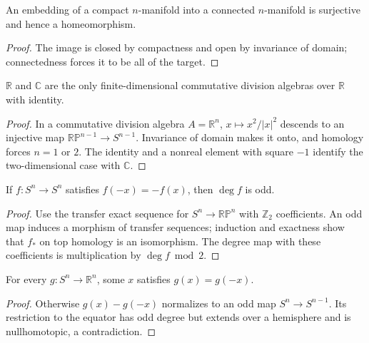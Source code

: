 \begin{corollary}
\label{cor:embedding-compact-manifold-connected}

An embedding of a compact $n$-manifold into a connected $n$-manifold is surjective and hence a homeomorphism.
\end{corollary}
\begin{proof}
\sketch The image is closed by compactness and open by invariance of domain; connectedness forces it to be all of the target.
\end{proof}

\begin{theorem}
\label{thm:real-complex-division-algebras}

$\mathbb{R}$ and $\mathbb{C}$ are the only finite-dimensional commutative division algebras over $\mathbb{R}$ with identity.
\end{theorem}
\begin{proof}
\sketch In a commutative division algebra $A=\mathbb{R}^n$, $x\mapsto x^2/|x|^2$ descends to an injective map $\mathbb{RP}^{n-1}\to S^{n-1}$.  Invariance of domain makes it onto, and homology forces $n=1$ or $2$.  The identity and a nonreal element with square $-1$ identify the two-dimensional case with $\mathbb{C}$.
\end{proof}

\begin{proposition}
\label{prop:odd-map-odd-degree}

If $f:S^n\to S^n$ satisfies $f(-x)=-f(x)$, then $\deg f$ is odd.
\end{proposition}
\begin{proof}
\sketch Use the transfer exact sequence for $S^n\to\mathbb{RP}^n$ with $\mathbb{Z}_2$ coefficients.  An odd map induces a morphism of transfer sequences; induction and exactness show that $f_*$ on top homology is an isomorphism.  The degree map with these coefficients is multiplication by $\deg f\bmod2$.
\end{proof}

\begin{corollary}
\label{cor:borsuk-ulam}

For every $g:S^n\to\mathbb{R}^n$, some $x$ satisfies $g(x)=g(-x)$.
\end{corollary}
\begin{proof}
\sketch Otherwise $g(x)-g(-x)$ normalizes to an odd map $S^n\to S^{n-1}$.  Its restriction to the equator has odd degree but extends over a hemisphere and is nullhomotopic, a contradiction.
\end{proof}

